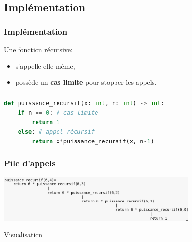 \documentclass[svgnames,11pt]{beamer}
\begin{document}
\subsection{Implémentation}
\begin{frame}
    \frametitle{Implémentation}

\begin{aretenir}[]
Une fonction récursive:
\begin{itemize}
    \item s'appelle elle-même,
    \item possède un \textbf{cas limite} pour stopper les appels.
\end{itemize}
\end{aretenir}

\end{frame}
\begin{frame}[fragile]
    \frametitle{}

    \begin{center}
    \begin{lstlisting}[language=Python , basicstyle=\ttfamily\small, xleftmargin=2em, xrightmargin=1em]
def puissance_recursif(x: int, n: int) -> int:
    if n == 0: # cas limite
        return 1
    else: # appel récursif
        return x*puissance_recursif(x, n-1)
\end{lstlisting}
    \label{CODE}
    \end{center}

\end{frame}
\begin{frame}[fragile]
    \frametitle{Pile d'appels}

\begin{center}
\centering
\includegraphics[width=10cm]{ressources/pile-appels.png}

\end{center}
\begin{center}
    \href{http://pythontutor.com/visualize.html#code=def%20puissance_recursif%28x%3A%20int,%20n%3A%20int%29%20-%3E%20int%3A%0A%20%20%20%20if%20n%20%3D%3D%200%3A%20%23%20cas%20limite%0A%20%20%20%20%20%20%20%20return%201%0A%20%20%20%20else%3A%20%23%20appel%20r%C3%A9cursif%0A%20%20%20%20%20%20%20%20return%20x*puissance_recursif%28x,%20n-1%29%0A%0Apuissance_recursif%286,4%29&cumulative=false&curInstr=0&heapPrimitives=nevernest&mode=display&origin=opt-frontend.js&py=3&rawInputLstJSON=%5B%5D&textReferences=false}{Visualisation}
\end{center}

\end{frame}
\end{document}
